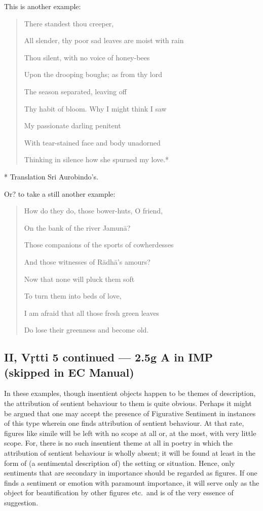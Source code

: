 \documentclass[12pt]{book}
\begin{document}
This is another example:

\begin{quotation}
\begin{em}
There standest thou creeper,

All slender, thy poor sad leaves are moist with rain

Thou silent, with no voice of honey-bees

Upon the drooping boughs; as from thy lord

The season separated, leaving off

Thy habit of bloom. Why I might think I saw

My passionate darling penitent

With tear-stained face and body unadorned

Thinking in silence how she spurned my love.*
\end{em}
\end{quotation}
* Translation Sri Aurobindo's.

Or? to take a still another example:

\begin{quotation}
\begin{em}
How do they do, those bower-huts, O friend,

On the bank of the river Jamunā?

Those companions of the sports of cowherdesses

And those witnesses of Rādhā's amours?

Now that none will pluck them soft

To turn them into beds of love,

I am afraid that all those fresh green leaves

Do lose their greenness and become old.
\end{em}
\end{quotation}


\subsection{II, Vṛtti 5 continued --- 2.5g A in IMP (skipped in EC Manual)}

In these examples, though insentient objects happen to be
themes of description, the attribution of sentient behaviour to
them is quite obvious. Perhaps it might be argued that one
may accept the presence of Figurative Sentiment in instances of
this type wherein one finds attribution of sentient behaviour.
At that rate, figures like simile will be left with no scope at all
or, at the most, with very little scope. For, there is no such
insentient theme at all in poetry in which the attribution of
sentient behaviour is wholly absent; it will be found at least in
the form of (a sentimental description of) the setting or situation.
Hence, only sentiments that are secondary in importance should be
regarded as figures. If one finds a sentiment or emotion with
paramount importance, it will serve only as the object for beautification by other figures etc.\ and is of the very essence of
suggestion. 
\end{document}
